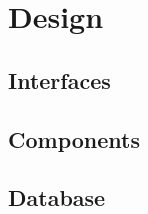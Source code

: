 \chapter{Design}\label{part:design}








 
\section{Interfaces}
 
\section{Components}
 
\section{Database}
 

